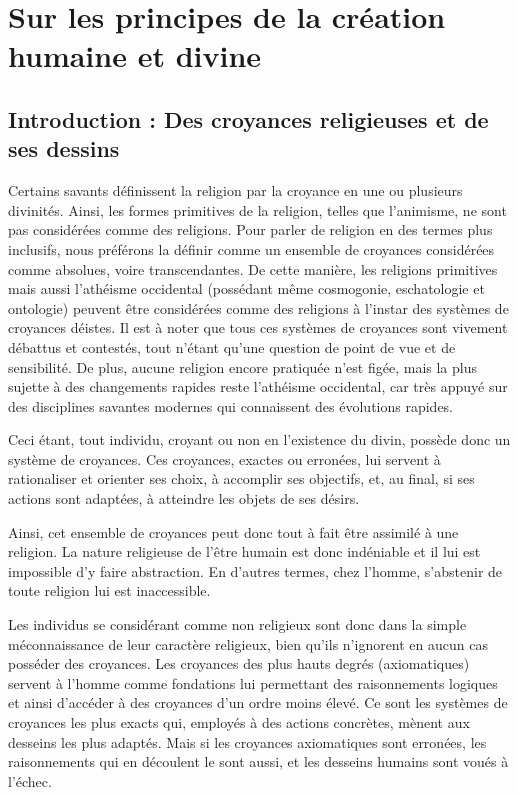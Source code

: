 \part{Sur les principes de la création humaine et divine}

\chapter{Introduction : Des croyances religieuses et de ses dessins}

Certains savants définissent la religion par la croyance en une ou plusieurs divinités. Ainsi, les formes primitives de la religion, telles que l'animisme, ne sont pas considérées comme des religions. Pour parler de religion en des termes plus inclusifs, nous préférons la définir comme un ensemble de croyances considérées comme absolues, voire transcendantes. De cette manière, les religions primitives mais aussi l'athéisme occidental (possédant même cosmogonie, eschatologie et ontologie) peuvent être considérées comme des religions à l'instar des systèmes de croyances déistes. Il est à noter que tous ces systèmes de croyances sont vivement débattus et contestés, tout n'étant qu'une question de point de vue et de sensibilité. De plus, aucune religion encore pratiquée n'est figée, mais la plus sujette à des changements rapides reste l’athéisme occidental, car très appuyé sur des disciplines savantes modernes qui connaissent des évolutions rapides.

Ceci étant, tout individu, croyant ou non en l’existence du divin, possède donc un système de croyances. Ces croyances, exactes ou erronées, lui servent à rationaliser et orienter ses choix, à accomplir ses objectifs, et, au final, si ses actions sont adaptées, à atteindre les objets de ses désirs.

Ainsi, cet ensemble de croyances peut donc tout à fait être assimilé à une religion. La nature religieuse de l’être humain est donc indéniable et il lui est impossible d’y faire abstraction. En d’autres termes, chez l’homme, s'abstenir de toute religion lui est inaccessible.

Les individus se considérant comme non religieux sont donc dans la simple méconnaissance de leur caractère religieux, bien qu’ils n’ignorent en aucun cas posséder des croyances. Les croyances des plus hauts degrés (axiomatiques) servent à l'homme comme fondations lui permettant des raisonnements logiques et ainsi d’accéder à des croyances d’un ordre moins élevé. Ce sont les systèmes de croyances les plus exacts qui, employés à des actions concrètes, mènent aux desseins les plus adaptés. Mais si les croyances axiomatiques sont erronées, les raisonnements qui en découlent le sont aussi, et les desseins humains sont voués à l'échec.

